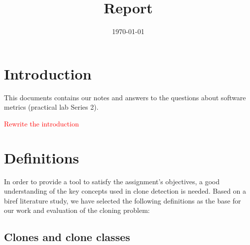 \documentclass{uva-inf-article}
\title{Report}
\date{\today}
\newcommand\todo[1]{\textcolor{red}{#1}}
\begin{document}
\maketitle




\section{Introduction}

This documents contains our notes and answers to the questions about software metrics (practical lab Series 2).

\todo{Rewrite the introduction}

\section{Definitions}

In order to provide a tool to satisfy the assignment's objectives, a good understanding of the key concepts used in clone detection is needed. Based on a biref literature study, we have selected the following definitions as the base for our work and evaluation of the cloning problem:

\subsection{Clones and clone classes}
\end{document}
